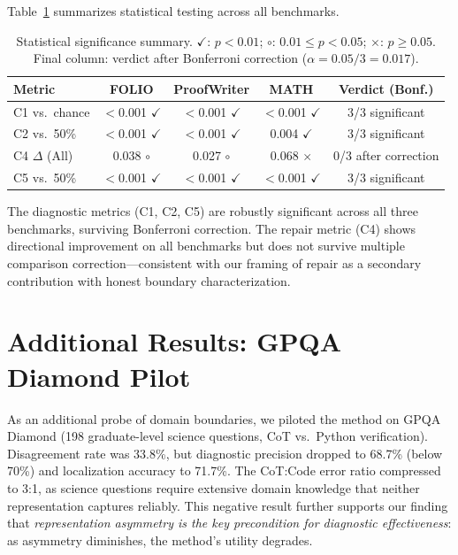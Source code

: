 \documentclass[11pt,a4paper]{article}
\begin{document}
Table~\ref{tab:stats} summarizes statistical testing across all benchmarks.

\begin{table}[t]
\centering
\small
\caption{Statistical significance summary. $\checkmark$: $p<0.01$; $\circ$: $0.01 \leq p < 0.05$; $\times$: $p \geq 0.05$. Final column: verdict after Bonferroni correction ($\alpha = 0.05/3 = 0.017$).}
\label{tab:stats}
\begin{tabular}{lcccc}
\toprule
\textbf{Metric} & \textbf{FOLIO} & \textbf{ProofWriter} & \textbf{MATH} & \textbf{Verdict (Bonf.)} \\
\midrule
C1 vs.\ chance & $<$0.001 $\checkmark$ & $<$0.001 $\checkmark$ & $<$0.001 $\checkmark$ & 3/3 significant \\
C2 vs.\ 50\% & $<$0.001 $\checkmark$ & $<$0.001 $\checkmark$ & 0.004 $\checkmark$ & 3/3 significant \\
C4 $\Delta$ (All) & 0.038 $\circ$ & 0.027 $\circ$ & 0.068 $\times$ & 0/3 after correction \\
C5 vs.\ 50\% & $<$0.001 $\checkmark$ & $<$0.001 $\checkmark$ & $<$0.001 $\checkmark$ & 3/3 significant \\
\bottomrule
\end{tabular}
\end{table}

The diagnostic metrics (C1, C2, C5) are robustly significant across all three benchmarks, surviving Bonferroni correction. The repair metric (C4) shows directional improvement on all benchmarks but does not survive multiple comparison correction---consistent with our framing of repair as a secondary contribution with honest boundary characterization.

\section{Additional Results: GPQA Diamond Pilot}
\label{sec:gpqa}

As an additional probe of domain boundaries, we piloted the method on GPQA Diamond (198 graduate-level science questions, CoT vs.\ Python verification). Disagreement rate was 33.8\%, but diagnostic precision dropped to 68.7\% (below 70\%) and localization accuracy to 71.7\%. The CoT:Code error ratio compressed to 3:1, as science questions require extensive domain knowledge that neither representation captures reliably. This negative result further supports our finding that \emph{representation asymmetry is the key precondition for diagnostic effectiveness}: as asymmetry diminishes, the method's utility degrades.
\end{document}

